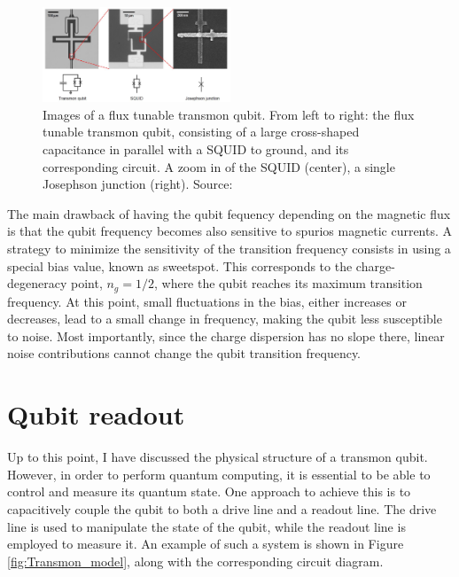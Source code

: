 \begin{figure}[ht!]
    \centering
    \includegraphics[width=0.50\textwidth]{figures/png/FrequencyTunableTransmon.png}
    \caption{Images of a flux tunable transmon qubit. From left to right: the flux tunable transmon qubit, consisting of a large cross-shaped capacitance in parallel with a SQUID to ground, and its corresponding circuit. A zoom in of the SQUID (center), a single Josephson junction (right). Source: \cite{Roth_2023}}
    \label{fig:FrequencyTunableTransmon}
\end{figure}

The main drawback of having the qubit fequency depending on the magnetic flux is that the qubit frequency becomes also sensitive to spurios magnetic currents.
A strategy to minimize the sensitivity of the transition frequency consists in using a special bias value, known as sweetspot. 
This corresponds to the charge-degeneracy point, $n_g = 1/2$, where the qubit reaches its maximum transition frequency. 
At this point, small fluctuations in the bias, either increases or decreases, lead to a small change in frequency, making the qubit less susceptible to noise.
Most importantly, since the charge dispersion has no slope there, linear noise contributions cannot change the qubit transition frequency.

\section{Qubit readout}\label{sec:cQED}
Up to this point, I have discussed the physical structure of a transmon qubit. 
However, in order to perform quantum computing, it is essential to be able to control and measure its quantum state.
One approach to achieve this is to capacitively couple the qubit to both a drive line and a readout line. 
The drive line is used to manipulate the state of the qubit, while the readout line is employed to measure it.
An example of such a system is shown in Figure \ref{fig:Transmon_model}, along with the corresponding circuit diagram.

